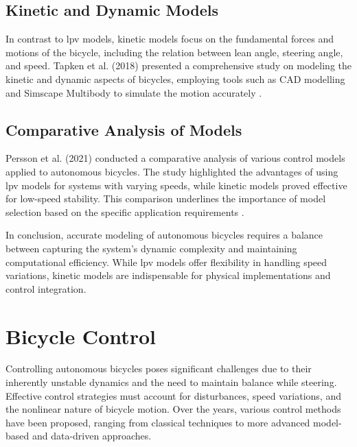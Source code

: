 \subsection{Kinetic and Dynamic Models}
In contrast to \gls{lpv} models, kinetic models focus on the fundamental forces and motions of the bicycle, including the relation between lean angle, steering angle, and speed. Tapken et al. (2018) presented a comprehensive study on modeling the kinetic and dynamic aspects of bicycles, employing tools such as CAD modelling and Simscape Multibody to simulate the motion accurately \cite{tapken2018modelling}.


\subsection{Comparative Analysis of Models}
Persson et al. (2021) conducted a comparative analysis of various control models applied to autonomous bicycles. The study highlighted the advantages of using \gls{lpv} models for systems with varying speeds, while kinetic models proved effective for low-speed stability. This comparison underlines the importance of model selection based on the specific application requirements \cite{persson2021comparative}.

In conclusion, accurate modeling of autonomous bicycles requires a balance between capturing the system's dynamic complexity and maintaining computational efficiency. While \gls{lpv} models offer flexibility in handling speed variations, kinetic models are indispensable for physical implementations and control integration.

\section{Bicycle Control}

Controlling autonomous bicycles poses significant challenges due to their inherently unstable dynamics and the need to maintain balance while steering. Effective control strategies must account for disturbances, speed variations, and the nonlinear nature of bicycle motion. Over the years, various control methods have been proposed, ranging from classical techniques to more advanced model-based and data-driven approaches.

